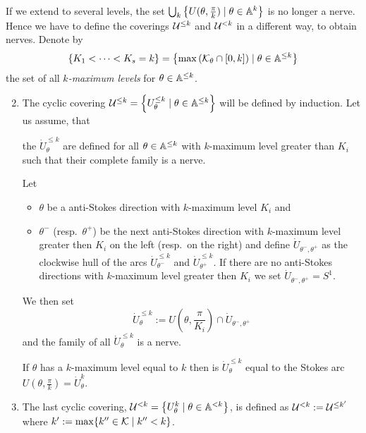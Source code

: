 If we extend to several levels, the set
$\bigcup_k\left\{U(\theta,\frac{\pi}{k})\mid\theta\in\mathbb{A}^{k}\right\}$ is no
longer a nerve.
Hence we have to define the coverings $\mathcal{U}^{\leq k}$ and $\mathcal{U}^{<k}$ in a
different way, to obtain nerves.
Denote by
\[
  \left\{K_1<\cdots<K_s=k\right\}
  =\left\{\max\left(\mathcal{K}_\theta\cap[0,k]\right)\mid\theta\in\mathbb{A}^{\leq k}\right\}
\]
the set of all \emph{$k$-maximum levels} for $\theta\in\mathbb{A}^{\leq k}$.
\begin{enumerate}
  \setcounter{enumi}{1}
  \item The cyclic covering
    $\mathcal{U}^{\leq k}=\left\{U_\theta^{\leq k}\mid\theta\in\mathbb{A}^{\leq k}\right\}$
    will be defined by induction.
    Let us assume, that
    \begin{einr}
      the $\dot U_\theta^{\leq k}$ are defined for all $\theta\in\mathbb{A}^{\leq k}$
      with $k$-maximum level greater than $K_i$ such that their complete family
      is a nerve.
    \end{einr}
    Let
    \begin{itemize}
      \item $\theta$ be a anti-Stokes direction with $k$-maximum level $K_i$
        and
      \item $\theta^-$ (resp.\ $\theta^+$) be the next anti-Stokes direction
        with $k$-maximum level greater then $K_i$ on the left (resp.\ on the
        right) and define $\dot U_{\theta^-,\theta^+}$ as the clockwise hull of
        the arcs $\dot U_{\theta^-}^{\leq k}$ and $\dot U_{\theta^+}^{\leq k}$.
        If there are no anti-Stokes directions with $k$-maximum level greater
        then $K_i$ we set $\dot U_{\theta^-,\theta^+}=S^1$.
    \end{itemize}
    We then set
    \[
      \dot U_\theta^{\leq k}
        :=U\left(\theta,\frac{\pi}{K_i}\right)\cap\dot U_{\theta^-,\theta^+}
    \]
    and the family of all $\dot U_\theta^{\leq k}$ is a nerve.\TODO[proof!]
    \begin{rem}
      If $\theta$ has a $k$-maximum level equal to $k$ then is
      $\dot U_\theta^{\leq k}$ equal to the Stokes arc
      $U\left(\theta,\frac{\pi}{k}\right)=\dot U_\theta^k$.
      \begin{comment}
        and then no $0$-cochain with level $k$ or $\geq k$ can exists on the
        covering $\cU\leq{k}$.
      \end{comment}
    \end{rem}
\end{enumerate}

\begin{enumerate}
  \setcounter{enumi}{2}
\item The last cyclic covering,
  $\mathcal{U}^{<k}=\left\{U_{\theta}^k\mid\theta\in\mathbb{A}^{<k}\right\}$, is defined as
  $\mathcal{U}^{<k}:=\mathcal{U}^{\leq k'}$ where $k':=\max\{k''\in\mathcal{K}\mid k''<k\}$.
\end{enumerate}

